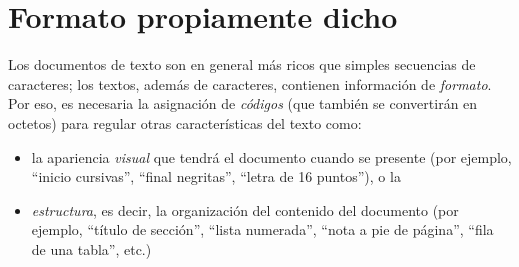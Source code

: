 \section{Formato propiamente dicho}\label{ss:format} Los documentos de texto son en general más ricos que simples secuencias de caracteres; los textos, además de caracteres, contienen información de \emph{formato}. Por eso, es necesaria la asignación de \emph{códigos} (que también se convertirán en octetos) para regular otras características del texto como: \begin{itemize} \item la apariencia \emph{visual} que tendrá el documento cuando se presente (por ejemplo, ``inicio cursivas'', ``final negritas'', ``letra de 16 puntos''), o la  \item \emph{estructura}, es decir, la organización del contenido del documento (por ejemplo, ``título de sección'', ``lista numerada'', ``nota a pie de página'', ``fila de una tabla'', etc.) \end{itemize} 

